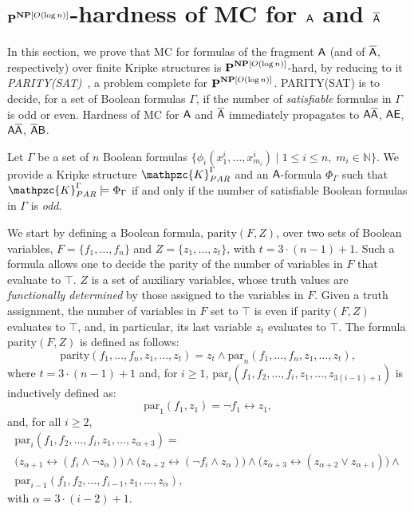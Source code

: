 \section{$\textbf{P}^{\textbf{NP}[O(\log n)]}$-hardness of MC for $\mathsf{A}$ and $\mathsf{\overline{A}}$}\label{sect:AHard}

In this section, we prove that MC for formulas of the fragment $\mathsf{A}$ (and of $\mathsf{\overline{A}}$, respectively) over finite Kripke structures is $\textbf{P}^{\textbf{NP}[O(\log n)]}$-hard, by reducing to it \emph{PARITY(SAT)}~\cite{WAGNER87}, a problem complete for $\textbf{P}^{\textbf{NP}[O(\log n)]}$.
PARITY(SAT) is to decide, for a  set of Boolean formulas $\Gamma$,
if the number of \emph{satisfiable} formulas in $\Gamma$ is odd or even. Hardness of MC for $\mathsf{A}$ and  $\mathsf{\overline{A}}$ immediately propagates to $\mathsf{A\overline{A}}$, $\mathsf{AE}$, $\mathsf{A\overline{A}}$, $\mathsf{\overline{A}B}$.

Let $\Gamma$ be a set of $n$ Boolean formulas $\{\phi_i(x_1^i,\ldots , x_{m_i}^i)\mid 1 \leq i \leq n,\; m_i\in\mathbb{N}\}$. We provide a Kripke structure $\mathpzc{K}_{PAR}^{\Gamma}$ and an $\mathsf{A}$-formula $\Phi_{\Gamma}$ such that $\mathpzc{K}_{PAR}^{\Gamma}\models \Phi_{\Gamma}$ if and only if the number of satisfiable Boolean formulas in $\Gamma$ is \emph{odd}.
 
We start by defining a Boolean formula, $\text{parity}(F, Z)$, over two sets of Boolean variables, $F=\{f_1,\ldots, f_n\}$ and $Z=\{z_1,\ldots ,z_t\}$, with $t=3 \cdot (n-1)+1$. Such a formula allows one to decide the parity of the number of variables in $F$ that evaluate to $\top$. $Z$ is a set of auxiliary variables, whose truth values are \emph{functionally determined} by those assigned to the variables in $F$. Given a truth assignment, the number of variables in $F$ set to $\top$ is even if $\text{parity}(F, Z)$ evaluates to $\top$, and, in particular, its last variable $z_t$ evaluates to $\top$.
%
 The formula $\text{parity}(F, Z)$ is defined as follows:
\[\text{parity}(f_1,\ldots ,f_n,z_1,\ldots ,z_t)=z_t\wedge\text{par}_n(f_1,\ldots ,f_n,z_1,\ldots ,z_t), \]
%
where $t=3 \cdot (n-1)+1$ and, 
for $i \geq 1$, $\text{par}_{i}(f_1,f_2,\ldots, f_i,z_1, \ldots , z_{3(i-1)+1})$ is inductively defined as: \[\text{par}_1(f_1,z_1)=\neg f_1\leftrightarrow z_1,\] and, for all   $i\geq 2$,
\begin{multline*}
    \text{par}_{i}(f_1,f_2,\ldots, f_i,z_1, \ldots ,z_{\alpha+3})=\\
    \big(z_{\alpha+1}\leftrightarrow (f_i \wedge \neg z_{\alpha})\big) \wedge \big(z_{\alpha+2}\leftrightarrow (\neg f_i \wedge z_{\alpha})\big) \wedge \big(z_{\alpha+3}\leftrightarrow (z_{\alpha+2} \vee z_{\alpha+1})\big) \wedge\\
    \text{par}_{i-1}(f_1,f_2,\ldots, f_{i-1},z_1, \ldots ,z_{\alpha}),
\end{multline*}
with $\alpha= 3 \cdot (i-2)+1$.

